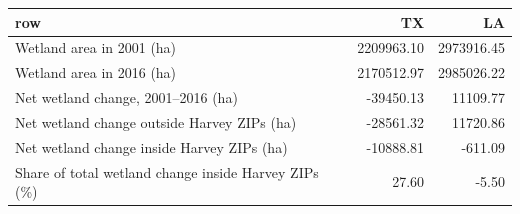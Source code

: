 \begin{tabular}{lrr}
  \hline
row & TX & LA \\ 
  \hline
Wetland area in 2001 (ha) & 2209963.10 & 2973916.45 \\ 
  Wetland area in 2016 (ha) & 2170512.97 & 2985026.22 \\ 
  Net wetland change, 2001–2016 (ha) & -39450.13 & 11109.77 \\ 
  Net wetland change outside Harvey ZIPs (ha) & -28561.32 & 11720.86 \\ 
  Net wetland change inside Harvey ZIPs (ha) & -10888.81 & -611.09 \\ 
  Share of total wetland change inside Harvey ZIPs (\%) & 27.60 & -5.50 \\ 
   \hline
\end{tabular}

